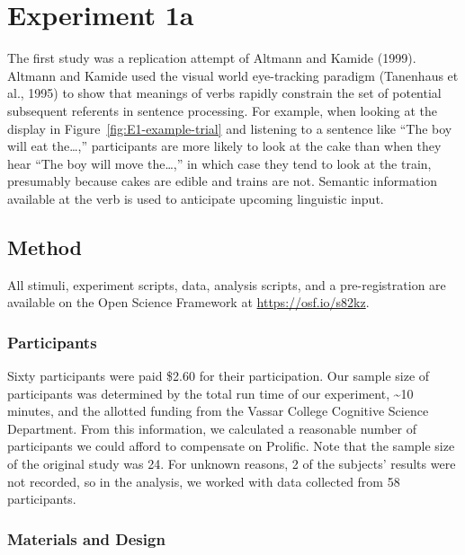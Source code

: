 \documentclass[
  man,floatsintext]{apa6}
\begin{document}
\section{Experiment 1a}\label{experiment-1a}

The first study was a replication attempt of
Altmann and Kamide (1999). Altmann and Kamide used the
visual world eye-tracking paradigm (Tanenhaus et al., 1995) to show that
meanings of verbs rapidly constrain the set of potential subsequent
referents in sentence processing. For example, when looking at the
display in Figure~\ref{fig:E1-example-trial} and listening to a sentence like
``The boy will eat the\ldots,'' participants are more likely to look at the cake than
when they hear ``The boy will move the\ldots,'' in which case they tend to look at the
train, presumably because cakes are edible and trains are not. Semantic
information available at the verb is used to anticipate upcoming
linguistic input.

\subsection{Method}\label{method}

All stimuli, experiment scripts, data, analysis scripts, and a
pre-registration are available on the Open Science Framework at
\url{https://osf.io/s82kz}.

\subsubsection{Participants}\label{participants-1}

Sixty participants were paid \$2.60 for their participation. Our sample size
of participants was determined by the total run time of our experiment,
\textasciitilde10 minutes, and the allotted funding from the Vassar College Cognitive
Science Department. From this information, we calculated a reasonable
number of participants we could afford to compensate on Prolific. Note
that the sample size of the original study was 24. For unknown reasons,
2 of the subjects' results were not recorded, so in the analysis, we
worked with data collected from 58 participants.

\subsubsection{Materials and Design}\label{materials-and-design}
\end{document}
